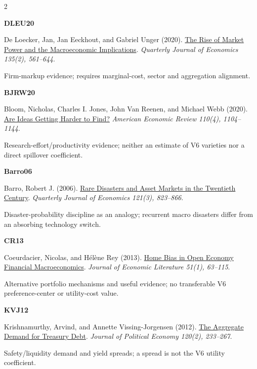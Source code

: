 \documentclass[10pt,a4paper,landscape]{article}
\begin{document}
\begin{multicols}{2}
\noindent\begin{minipage}{\linewidth}\raggedright\hypertarget{ref:DLEU}{\textbf{DLEU20}} De Loecker, Jan, Jan Eeckhout, and Gabriel Unger (2020). \href{https://doi.org/10.1093/qje/qjz041}{The Rise of Market Power and the Macroeconomic Implications}. \emph{Quarterly Journal of Economics 135(2), 561--644}.\par Firm-markup evidence; requires marginal-cost, sector and aggregation alignment.\end{minipage}\par\vspace{6pt}
\noindent\begin{minipage}{\linewidth}\raggedright\hypertarget{ref:BJRW}{\textbf{BJRW20}} Bloom, Nicholas, Charles I. Jones, John Van Reenen, and Michael Webb (2020). \href{https://doi.org/10.1257/aer.20180338}{Are Ideas Getting Harder to Find?} \emph{American Economic Review 110(4), 1104--1144}.\par Research-effort/productivity evidence; neither an estimate of V6 varieties nor a direct spillover coefficient.\end{minipage}\par\vspace{6pt}
\noindent\begin{minipage}{\linewidth}\raggedright\hypertarget{ref:BARRO}{\textbf{Barro06}} Barro, Robert J. (2006). \href{https://doi.org/10.1162/qjec.121.3.823}{Rare Disasters and Asset Markets in the Twentieth Century}. \emph{Quarterly Journal of Economics 121(3), 823--866}.\par Disaster-probability discipline as an analogy; recurrent macro disasters differ from an absorbing technology switch.\end{minipage}\par\vspace{6pt}
\noindent\begin{minipage}{\linewidth}\raggedright\hypertarget{ref:CR}{\textbf{CR13}} Coeurdacier, Nicolas, and Hélène Rey (2013). \href{https://doi.org/10.1257/jel.51.1.63}{Home Bias in Open Economy Financial Macroeconomics}. \emph{Journal of Economic Literature 51(1), 63--115}.\par Alternative portfolio mechanisms and useful evidence; no transferable V6 preference-center or utility-cost value.\end{minipage}\par\vspace{6pt}
\noindent\begin{minipage}{\linewidth}\raggedright\hypertarget{ref:KVJ}{\textbf{KVJ12}} Krishnamurthy, Arvind, and Annette Vissing-Jorgensen (2012). \href{https://doi.org/10.1086/666526}{The Aggregate Demand for Treasury Debt}. \emph{Journal of Political Economy 120(2), 233--267}.\par Safety/liquidity demand and yield spreads; a spread is not the V6 utility coefficient.\end{minipage}\par\vspace{6pt}

\end{multicols}
\end{document}
